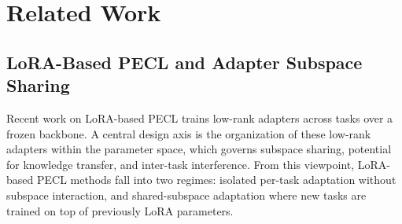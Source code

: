 \documentclass{article}
\theoremstyle{plain}
\theoremstyle{definition}
\theoremstyle{remark}
\begin{document}


\section{Related Work}

\subsection{LoRA-Based PECL and Adapter Subspace Sharing}

Recent work on LoRA-based PECL trains low-rank adapters across tasks over a frozen backbone. A central design axis is the organization of these low-rank adapters within the parameter space, which governs subspace sharing, potential for knowledge transfer, and inter-task interference.
From this viewpoint, LoRA-based PECL methods fall into two regimes: isolated per-task adaptation without subspace interaction, and shared-subspace adaptation where new tasks are trained on top of previously LoRA parameters.
\end{document}
